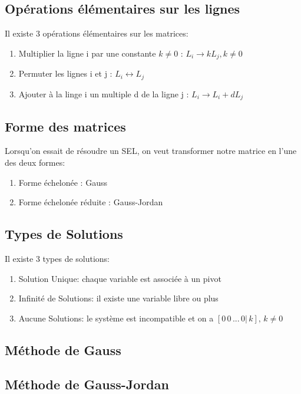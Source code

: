 \documentclass{article}
\begin{document}
\subsection{Opérations élémentaires sur les lignes}

Il existe 3 opérations élémentaires sur les matrices:
\begin{enumerate}
    \item Multiplier la ligne i par une constante $k \neq 0$ : $L_i \rightarrow
	k L_j , k \neq 0$
    \item Permuter les lignes i et j : $ L_i \leftrightarrow L_j$
    \item Ajouter à la linge i un multiple d de la ligne j : $ L_i \rightarrow
	L_i + d L_j$
\end{enumerate}

\subsection{Forme des matrices}

Lorsqu'on essait de résoudre un SEL, on veut transformer notre matrice en l'une
des deux formes:
\begin{enumerate}
    \item Forme échelonée : Gauss
    \item Forme échelonée réduite : Gauss-Jordan
\end{enumerate}

\subsection{Types de Solutions}

Il existe 3 types de solutions:
\begin{enumerate}
    \item Solution Unique: chaque variable est associée à un pivot
    \item Infinité de Solutions: il existe une variable libre ou plus
    \item Aucune Solutions: le système est incompatible et on a
	$ [0 \, 0 \, ... \, 0 | \, k], \, k \neq 0$
\end{enumerate}

\subsection{Méthode de Gauss}
\subsection{Méthode de Gauss-Jordan}
\end{document}
